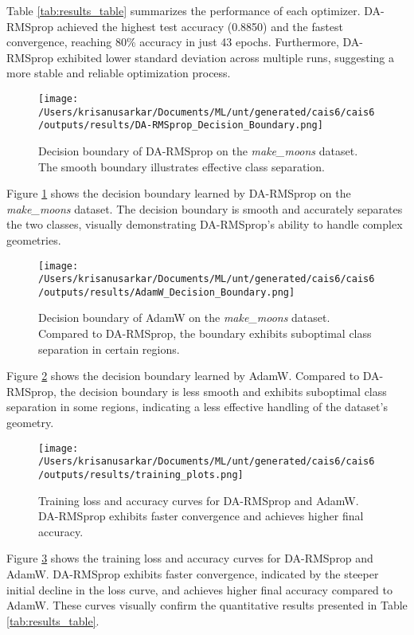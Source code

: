\documentclass[a4paper,11pt]{article}
\begin{document}
Table \ref{tab:results_table} summarizes the performance of each optimizer. DA-RMSprop achieved the highest test accuracy (0.8850) and the fastest convergence, reaching 80\% accuracy in just 43 epochs. Furthermore, DA-RMSprop exhibited lower standard deviation across multiple runs, suggesting a more stable and reliable optimization process.

\begin{figure}[h!]
    \centering
    \texttt{[image: /Users/krisanusarkar/Documents/ML/unt/generated/cais6/cais6/outputs/results/DA-RMSprop\_Decision\_Boundary.png]}
    \caption{Decision boundary of DA-RMSprop on the \textit{make\_moons} dataset. The smooth boundary illustrates effective class separation.}
    \label{fig:darms_decision_boundary}
\end{figure}

Figure \ref{fig:darms_decision_boundary} shows the decision boundary learned by DA-RMSprop on the \textit{make\_moons} dataset. The decision boundary is smooth and accurately separates the two classes, visually demonstrating DA-RMSprop's ability to handle complex geometries.

\begin{figure}[h!]
    \centering
    \texttt{[image: /Users/krisanusarkar/Documents/ML/unt/generated/cais6/cais6/outputs/results/AdamW\_Decision\_Boundary.png]}
    \caption{Decision boundary of AdamW on the \textit{make\_moons} dataset. Compared to DA-RMSprop, the boundary exhibits suboptimal class separation in certain regions.}
    \label{fig:adamw_decision_boundary}
\end{figure}

Figure \ref{fig:adamw_decision_boundary} shows the decision boundary learned by AdamW. Compared to DA-RMSprop, the decision boundary is less smooth and exhibits suboptimal class separation in some regions, indicating a less effective handling of the dataset's geometry.

\begin{figure}[h!]
    \centering
    \texttt{[image: /Users/krisanusarkar/Documents/ML/unt/generated/cais6/cais6/outputs/results/training\_plots.png]}
    \caption{Training loss and accuracy curves for DA-RMSprop and AdamW. DA-RMSprop exhibits faster convergence and achieves higher final accuracy.}
    \label{fig:training_plots}
\end{figure}

Figure \ref{fig:training_plots} shows the training loss and accuracy curves for DA-RMSprop and AdamW. DA-RMSprop exhibits faster convergence, indicated by the steeper initial decline in the loss curve, and achieves higher final accuracy compared to AdamW. These curves visually confirm the quantitative results presented in Table \ref{tab:results_table}.
\end{document}
